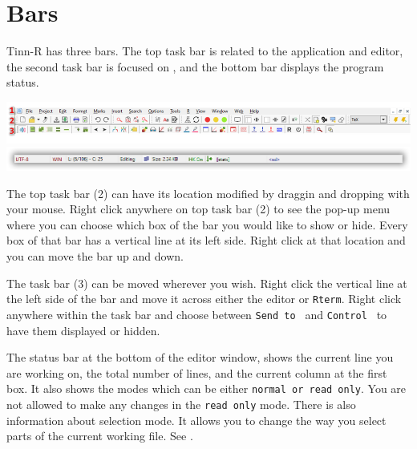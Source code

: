 
\section{Bars}

Tinn-R has three bars. The top task bar is related to the application and editor,
the second task bar is focused on \RR{}, and the bottom bar displays the program status.

\includegraphics[scale=0.50]{./res/parts_02.png}
\includegraphics[scale=0.50]{./res/status_bar.png}

The top task bar (2) can have its location modified by draggin and dropping with your mouse.
Right click anywhere on top task bar (2) to see the pop-up menu where you can choose which box
of the bar you would like to show or hide. Every box of that bar has a vertical line at its left side.
Right click at that location and you can move the bar up and down.

The \RR{} task bar (3) can be moved wherever you wish. Right click the vertical line at the left side of the
bar and move it across either the editor or \texttt{Rterm}. Right click anywhere within the \RR{} task bar and choose between
\texttt{Send to \RR{}} and \texttt{Control \RR{}} to have them displayed or hidden.

The status bar at the bottom of the editor window, shows the current line you are working on,
the total number of lines, and the current column at the first box.
It also shows the modes which can be either \texttt{normal or read only}.
You are not allowed to make any changes in the \texttt{read only} mode.
There is also information about selection mode. It allows you to change the way you select parts of the current working file.
See \textit{}.

